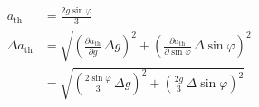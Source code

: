 \begin{align}
  a_\mathrm{th} &= \frac{2 g \sin\varphi}{3} \label{eq:a_th} \\
  \Delta a_\mathrm{th} &= \sqrt{\left(\frac{\partial a_\mathrm{th}}{\partial g}\,\Delta g\right)^2 + \left(\frac{\partial a_\mathrm{th}}{\partial \sin\varphi}\,\Delta \sin\varphi\right)^2} \nonumber \\
  &= \sqrt{\left(\frac{2 \sin\varphi}{3}\,\Delta g\right)^2 + \left(\frac{2 g}{3}\,\Delta \sin\varphi\right)^2} \label{eq:da_th}
\end{align}
